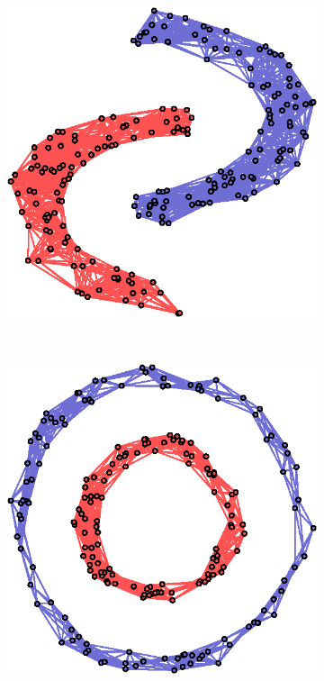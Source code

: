 \begin{figure}[!htb]
    \centering
    \begin{subfigure}[b]{0.23\textwidth}
        \includegraphics[width=\textwidth]{clusters/twomoon.eps}
    \end{subfigure}
    ~ %
    \begin{subfigure}[b]{0.23\textwidth}
        \includegraphics[width=\textwidth]{clusters/circles2.eps}

\end{subfigure}
\end{figure}
